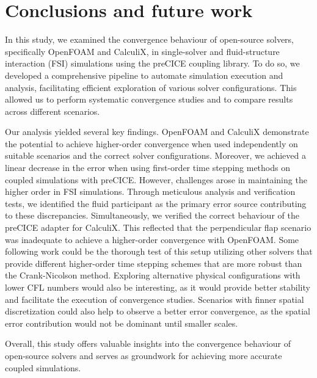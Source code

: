 \documentclass[
  english,        %
  font=times,     %
  onecolumn,      %
]{tumarticle}
\begin{document}
\section{Conclusions and future work}
In this study, we examined the convergence behaviour of open-source solvers, specifically OpenFOAM and CalculiX, in single-solver and fluid-structure interaction (FSI) simulations using the preCICE coupling library. To do so, we developed a comprehensive pipeline to automate simulation execution and analysis, facilitating efficient exploration of various solver configurations. This allowed us to perform systematic convergence studies and to compare results across different scenarios. 

Our analysis yielded several key findings. OpenFOAM and CalculiX demonstrate the potential to achieve higher-order convergence when used independently on suitable scenarios and the correct solver configurations.
Moreover, we achieved a linear decrease in the error when using first-order time stepping methods on coupled simulations with preCICE. However, challenges arose in maintaining the higher order in FSI simulations. Through meticulous analysis and verification tests, we identified the fluid participant as the primary error source contributing to these discrepancies. Simultaneously, we verified the correct behaviour of the preCICE adapter for CalculiX. This reflected that the perpendicular flap scenario was inadequate to achieve a higher-order convergence with OpenFOAM. Some following work could be the thorough test of this setup utilizing other solvers that provide different higher-order time stepping schemes that are more robust than the Crank-Nicolson method. Exploring alternative physical configurations with lower CFL numbers would also be interesting, as it would provide better stability and facilitate the execution of convergence studies. Scenarios with finner spatial discretization could also help to observe a better error convergence, as the spatial error contribution would not be dominant until smaller scales. 

Overall, this study offers valuable insights into the convergence behaviour of open-source solvers and serves as groundwork for achieving more accurate coupled simulations.


\pagebreak

\printbibliography
\end{document}
